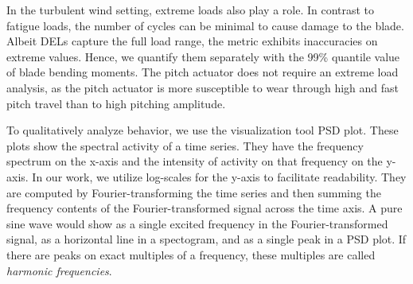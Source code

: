 
In the turbulent wind setting, extreme loads also play a role. In contrast to fatigue loads, the number of cycles can be minimal to cause damage to the blade. Albeit DELs capture the full load range, the metric exhibits inaccuracies on extreme values. Hence, we quantify them separately with the 99\% quantile value of blade bending moments. The pitch actuator does not require an extreme load analysis, as the pitch actuator is more susceptible to wear through high and fast pitch travel than to high pitching amplitude.

To qualitatively analyze behavior, we use the visualization tool \acf{PSD} plot. These plots show the spectral activity of a time series. They have the frequency spectrum on the x-axis and the intensity of activity on that frequency on the y-axis. In our work, we utilize log-scales for the y-axis to facilitate readability. They are computed by Fourier-transforming the time series and then summing the frequency contents of the Fourier-transformed signal across the time axis. A pure sine wave would show as a single excited frequency in the Fourier-transformed signal, as a horizontal line in a spectogram, and as a single peak in a \ac{PSD} plot. If there are peaks on exact multiples of a frequency, these multiples are called \textit{harmonic frequencies}.
